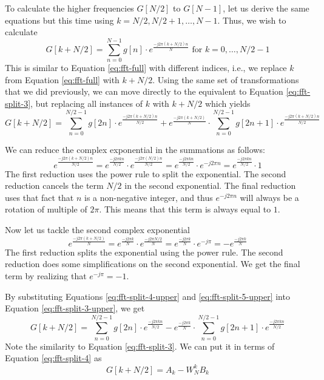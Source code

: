 To calculate the higher frequencies $G[N/2]$ to $G[N-1]$, let us derive the same equations but this time using $k = N/2, N/2 + 1, \dots, N -1$.  Thus, we wish to calculate
\begin{equation}
G[k + N/2] = \displaystyle\sum\limits_{n=0}^{N-1} g[n] \cdot e^{\frac{-j 2 \pi (k + N/2) n}{N}} \text{ for } k = 0, \dots, N/2 - 1
\label{eq:fft-upper}
\end{equation}
This is similar to Equation \ref{eq:fft-full} with different indices, i.e., we replace $k$ from Equation \ref{eq:fft-full} with $k + N/2$. Using the same set of transformations that we did previously, we can move directly to the equivalent to Equation \ref{eq:fft-split-3}, but replacing all instances of $k$ with $k + N/2$ which yields 
\begin{equation}
G[k + N/2] = \displaystyle\sum\limits_{n=0}^{N/2-1} g[2n] \cdot e^{\frac{-j 2 \pi (k + N/2) n}{N/2}} + e^{\frac{-j 2 \pi (k + N/2)}{N}} \cdot \displaystyle\sum\limits_{n=0}^{N/2-1} g[2n+1] \cdot e^{\frac{-j 2 \pi (k + N/2) n}{N/2}} 
\label{eq:fft-split-3-upper}
\end{equation}

We can reduce the complex exponential in the summations as follows:
\begin{equation}
e^{\frac{-j 2 \pi (k + N/2) n}{N/2}} = e^{\frac{-j 2 \pi k n}{N/2}} \cdot e^{\frac{-j 2 \pi (N/2) n}{N/2}} = e^{\frac{-j 2 \pi k n}{N/2}} \cdot e^{-j 2 \pi n} = e^{\frac{-j 2 \pi k n}{N/2}} \cdot 1
\label{eq:fft-split-4-upper}
\end{equation}
The first reduction uses the power rule to split the exponential. The second reduction cancels the term $N/2$ in the second exponential. The final reduction uses that fact that $n$ is a non-negative integer, and thus $e^{-j 2 \pi n}$ will always be a rotation of multiple of $2 \pi$. This means that this term is always equal to $1$. 

Now let us tackle the second complex exponential
\begin{equation}
e^{\frac{-j 2 \pi (k + N/2)}{N}} = e^{\frac{-j 2 \pi k }{N}} \cdot e^{\frac{-j 2 \pi N/2 }{N}} = e^{\frac{-j 2 \pi k }{N}} \cdot e^{-j  \pi} = - e^{\frac{-j 2 \pi k }{N}}
\label{eq:fft-split-5-upper}
\end{equation}
The first reduction splits the exponential using the power rule. The second reduction does some simplifications on the second exponential. We get the final term by realizing that $e^{-j \pi} = -1$.

By substituting Equations \ref{eq:fft-split-4-upper} and \ref{eq:fft-split-5-upper} into Equation \ref{eq:fft-split-3-upper}, we get
\begin{equation}
G[k + N/2] = \displaystyle\sum\limits_{n=0}^{N/2-1} g[2n] \cdot e^{\frac{-j 2 \pi k n}{N/2}} - e^{\frac{-j 2 \pi k}{N}} \cdot \displaystyle\sum\limits_{n=0}^{N/2-1} g[2n+1] \cdot e^{\frac{-j 2 \pi k n}{N/2}} 
\label{eq:fft-split-6-upper}
\end{equation}
Note the similarity to Equation \ref{eq:fft-split-3}. We can put it in terms of Equation \ref{eq:fft-split-4} as
\begin{equation}
G[k + N/2] = A_k - W_N^k B_k 
\label{eq:fft-split-7-upper}
\end{equation}

